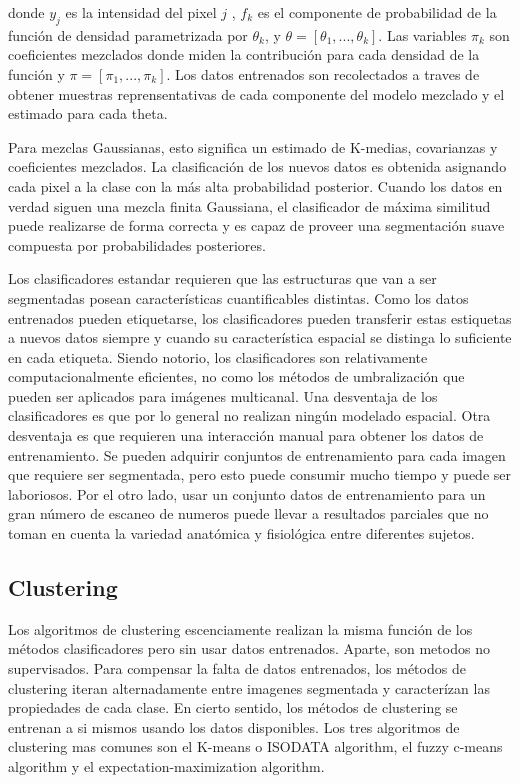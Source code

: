 \documentclass[12pt]{report}
\begin{document}
donde $y_{j}$ es la intensidad del pixel $j$ , $f_{k}$ es el componente de probabilidad de la función de densidad parametrizada por $\theta_{k}$, y $\theta = [\theta_{1},...,\theta_{k}]$. Las variables $\pi_{k}$ son coeficientes mezclados donde miden la contribución para cada densidad de la función y $\pi = [\pi_{1},...,\pi_{k}]$.
Los datos entrenados son recolectados a traves de obtener muestras reprensentativas de cada componente del modelo mezclado y el estimado para cada theta.

Para mezclas Gaussianas, esto significa un estimado de K-medias, covarianzas y coeficientes mezclados.
La clasificación de los nuevos datos es obtenida asignando cada pixel a la clase con la más alta probabilidad posterior. Cuando los datos en verdad siguen una mezcla finita Gaussiana, el clasificador de  máxima similitud puede realizarse de forma correcta y es capaz de proveer una segmentación suave compuesta por probabilidades posteriores.

Los clasificadores estandar requieren que las estructuras que van a ser segmentadas posean características cuantificables distintas. Como los datos entrenados pueden etiquetarse, los clasificadores pueden transferir estas estiquetas a nuevos datos siempre y cuando su característica espacial se distinga lo suficiente en cada etiqueta.
Siendo notorio, los clasificadores son relativamente computacionalmente eficientes, no como los métodos de umbralización que pueden ser aplicados para imágenes multicanal. Una desventaja de los clasificadores es que por lo general no realizan ningún modelado espacial. Otra desventaja es que requieren una interacción manual para obtener los datos de entrenamiento.
Se pueden adquirir conjuntos de entrenamiento para cada imagen que requiere ser segmentada, pero esto puede consumir mucho tiempo y puede ser laboriosos. Por el otro lado, usar un conjunto datos de entrenamiento para un gran número de escaneo de numeros puede llevar a resultados parciales que no toman en cuenta la variedad anatómica y fisiológica entre diferentes sujetos.\cite{metodos}

\subsection{Clustering}
Los algoritmos de clustering escenciamente realizan la misma función de los métodos clasificadores pero sin usar datos entrenados. Aparte, son metodos no supervisados. Para compensar la falta de datos entrenados, los métodos de clustering iteran alternadamente entre imagenes segmentada y caracterízan las propiedades de cada clase. En cierto sentido, los métodos de clustering se entrenan a si mismos usando los datos disponibles.
Los tres algoritmos de clustering mas comunes son el K-means o ISODATA algorithm, el fuzzy c-means algorithm y el expectation-maximization algorithm.\cite{split}
\end{document}
